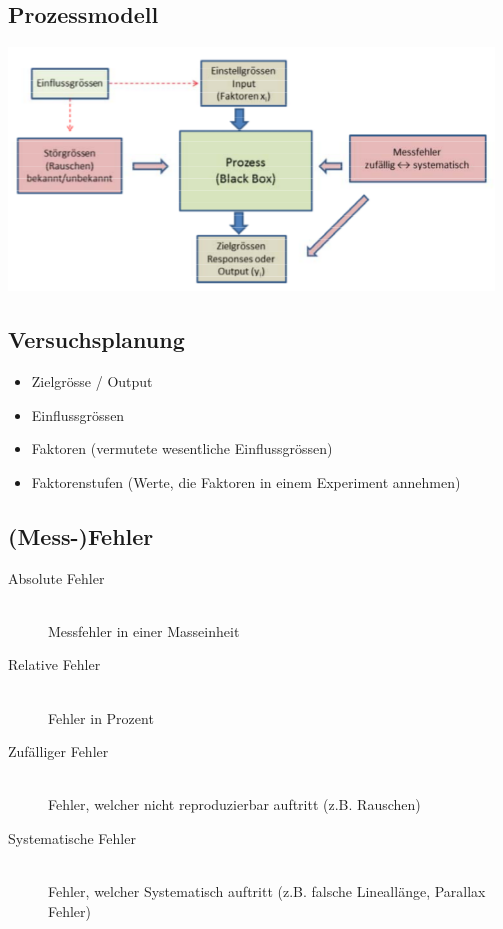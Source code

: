 \subsection{Prozessmodell}

	\includegraphics[scale=0.75]{img/prozessmodell.png}

\subsection{Versuchsplanung}

\begin{itemize}
	\item	Zielgrösse / Output
	\item	Einflussgrössen
	\item	Faktoren (vermutete wesentliche Einflussgrössen)
	\item	Faktorenstufen (Werte, die Faktoren in einem Experiment annehmen)
\end{itemize}

\subsection{(Mess-)Fehler}

\begin{description}
	\item[Absolute Fehler] \hfill \\
		Messfehler in einer Masseinheit
	\item[Relative Fehler] \hfill \\
		Fehler in Prozent
	\item[Zufälliger Fehler] \hfill \\
		Fehler, welcher nicht reproduzierbar auftritt (z.B. Rauschen)
	\item[Systematische Fehler] \hfill \\
		Fehler, welcher Systematisch auftritt (z.B. falsche Lineallänge, Parallax Fehler)
\end{description}

